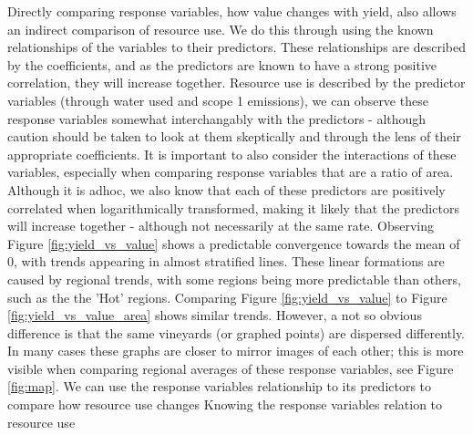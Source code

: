 \documentclass[review,12pt,authoryear]{elsarticle}
\begin{document}
\begin{linenumbers}
Directly comparing response variables, how value changes with yield, also allows an indirect comparison of resource use. We do this through using the known relationships of the variables to their predictors. These relationships are described by the coefficients, and as the predictors are known to have a strong positive correlation, they will increase together. Resource use is described by the predictor variables (through water used and scope 1 emissions), we can observe these response variables somewhat interchangably with the predictors - although caution should be taken to look at them skeptically and through the lens of their appropriate coefficients. It is important to also consider the interactions of these variables, especially when comparing response variables that are a ratio of area.
%
Although it is adhoc, we also know that each of these predictors are positively correlated when logarithmically transformed, making it likely that the predictors will increase together - although not necessarily at the same rate. Observing Figure \ref{fig:yield_vs_value} shows a predictable convergence towards the mean of 0, with trends appearing in almost stratified lines. These linear formations are caused by regional trends, with some regions being more predictable than others, such as the the 'Hot' regions.
\newline
Comparing Figure \ref{fig:yield_vs_value} to Figure \ref{fig:yield_vs_value_area} shows similar trends. However, a not so obvious difference is that the same vineyards (or graphed points) are dispersed differently. In many cases these graphs are closer to mirror images of each other; this is more visible when comparing regional averages of these response variables, see Figure \ref{fig:map}. 
We can use the response variables relationship to its predictors to compare how resource use changes 
Knowing the response variables relation to resource use 


\end{linenumbers}
\end{document}
